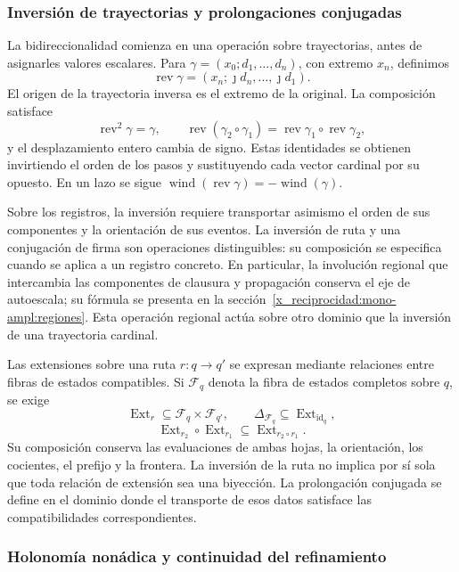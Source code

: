 \subsubsection{Inversión de trayectorias y prolongaciones conjugadas}
\label{x_reciprocidad:tpk-int:bidireccionalidad}

La bidireccionalidad comienza en una operación sobre trayectorias, antes
de asignarles valores escalares. Para
\(\gamma=(x_0;d_1,\ldots,d_n)\), con extremo \(x_n\), definimos
\[
 \operatorname{rev}\gamma
   =(x_n;\jmath d_n,\ldots,\jmath d_1).
\]
El origen de la trayectoria inversa es el extremo de la original.
La composición satisface
\[
 \operatorname{rev}^2\gamma=\gamma,\qquad
 \operatorname{rev}(\gamma_2\circ\gamma_1)
   =\operatorname{rev}\gamma_1\circ\operatorname{rev}\gamma_2,
\]
y el desplazamiento entero cambia de signo. Estas identidades se obtienen
invirtiendo el orden de los pasos y sustituyendo cada vector cardinal por
su opuesto. En un lazo se sigue
\(\operatorname{wind}(\operatorname{rev}\gamma)
=-\operatorname{wind}(\gamma)\).

Sobre los registros, la inversión requiere transportar asimismo el orden
de sus componentes y la orientación de sus eventos. La inversión de
ruta y una conjugación de firma son operaciones distinguibles: su
composición se especifica cuando se aplica a un registro concreto. En
particular, la involución regional que intercambia las componentes de
clausura y propagación conserva el eje de autoescala; su fórmula se
presenta en la sección~\ref{x_reciprocidad:mono-ampl:regiones}. Esta operación regional
actúa sobre otro dominio que la inversión de una trayectoria cardinal.

Las extensiones sobre una ruta \(r:q\to q'\) se expresan mediante
relaciones entre fibras de estados compatibles. Si \(\mathcal F_q\)
denota la fibra de estados completos sobre \(q\), se exige
\[
 \operatorname{Ext}_r\subseteq\mathcal F_q\times\mathcal F_{q'},
 \qquad \Delta_{\mathcal F_q}\subseteq
        \operatorname{Ext}_{\operatorname{id}_q},
\]
\[
 \operatorname{Ext}_{r_2}\circ\operatorname{Ext}_{r_1}
       \subseteq\operatorname{Ext}_{r_2\circ r_1}.
\]
Su composición conserva las evaluaciones de ambas hojas, la orientación,
los cocientes, el prefijo y la frontera. La inversión de la ruta no
implica por sí sola que toda relación de extensión sea una biyección.
La prolongación conjugada se define en el dominio donde el transporte de
esos datos satisface las compatibilidades correspondientes.

\subsubsection{Holonomía nonádica y continuidad del refinamiento}
\label{x_reciprocidad:tpk-int:holonomia}

